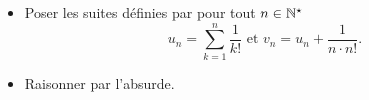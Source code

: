 \begin{itemize}
    \item Poser les suites définies par pour tout $n \in \mathbb{N}^\star$
    $$u_n = \sum_{k=1}^{n} \frac{1}{k!} \text{ et } v_n = u_n + \frac{1}{n \cdot n!}.$$
    \item Raisonner par l'absurde. 
\end{itemize}